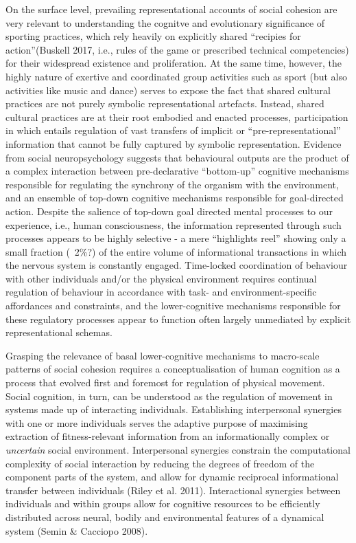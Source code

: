 \documentclass[12pt]{report}
\begin{document}
On the surface level, prevailing representational accounts of social cohesion are very relevant to understanding the cognitve and evolutionary significance of sporting practices, which rely heavily on explicitly shared ``recipies for action''(Buskell 2017, i.e., rules of the game or prescribed technical competencies) for their widespread existence and proliferation. At the same time, however, the highly  nature of exertive and coordinated group activities such as sport (but also activities like music and dance) serves to expose the fact that shared cultural practices are not purely symbolic representational artefacts. Instead, shared cultural practices are at their root embodied and enacted processes, participation in which entails regulation of vast transfers of implicit or ``pre-representational'' information that cannot be fully captured by symbolic representation.  Evidence from social neuropsychology suggests that behavioural outputs are the product of a complex interaction between pre-declarative ``bottom-up'' cognitive mechanisms responsible for regulating the synchrony of the organism with the environment, and an ensemble of top-down cognitive mechanisms responsible for goal-directed action.  Despite the salience of top-down goal directed mental processes to our experience, i.e., human consciousness, the information represented through such processes appears to be highly selective - a mere ``highlights reel'' showing only a small fraction (~2\%?) of the entire volume of informational transactions in which the nervous system is constantly engaged.  Time-locked coordination of behaviour with other individuals and/or the physical environment requires continual regulation of behaviour in accordance with task- and environment-specific affordances and constraints, and the lower-cognitive mechanisms responsible for these regulatory processes appear to function often largely unmediated by explicit representational schemas.

Grasping the relevance of basal lower-cognitive mechanisms to macro-scale patterns of social cohesion requires a conceptualisation of human cognition as a process that evolved first and foremost for regulation of physical movement. Social cognition, in turn, can be understood as the regulation of movement in systems made up of interacting individuals.  Establishing interpersonal synergies with one or more individuals serves the adaptive purpose of maximising extraction of fitness-relevant information from an informationally complex or \textit{uncertain} social environment. Interpersonal synergies constrain the computational complexity of social interaction by reducing the degrees of freedom of the component parts of the system, and allow for dynamic reciprocal informational transfer between individuals (Riley et al. 2011). Interactional synergies between individuals and within groups allow for cognitive resources to be efficiently distributed across neural, bodily and environmental features of a dynamical system (Semin & Cacciopo 2008).
\end{document}

